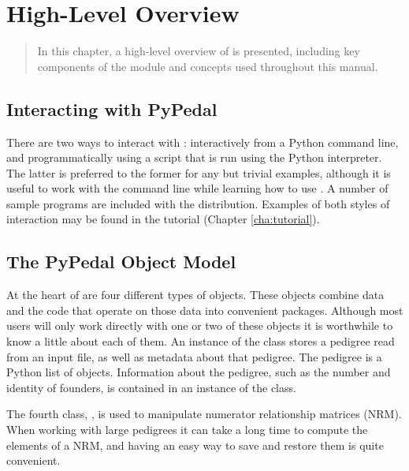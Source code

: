 \chapter{High-Level Overview}
\label{cha:high-level-overview}
\begin{quote}
In this chapter, a high-level overview of \PyPedal{} is presented, including key components of the module and concepts used throughout this manual.
\end{quote}
\section{Interacting with PyPedal}
\label{sec:interacting}
There are two ways to interact with \PyPedal{}: interactively from a Python command line, and programmatically using a script that is run using the Python interpreter.  The latter is preferred to the former for any but trivial examples, although it is useful to work with the command line while learning how to use \PyPedal{}.  A number of sample programs are included with the \PyPedal{} distribution.  Examples of both styles of interaction may be found in the tutorial (Chapter \ref{cha:tutorial}).
\section{The PyPedal Object Model}
\label{sec:pypedal-objects}
At the heart of \PyPedal{} are four different types of objects.  These objects
combine data and the code that operate on those data into convenient packages.
Although most \PyPedal{} users will only work directly with one or two of these
objects it is worthwhile to know a little about each of them.  An instance of the
 class stores a pedigree read from an input file, as well as
metadata about that pedigree.  The pedigree is a Python list of 
objects.  Information about the pedigree, such as the number and identity of founders,
is contained in an instance of the  class.

The fourth \PyPedal{} class, , is used to manipulate numerator
relationship matrices (NRM).  When working with large pedigrees it can take a long
time to compute the elements of a NRM, and having an easy way to save and restore
them is quite convenient.
